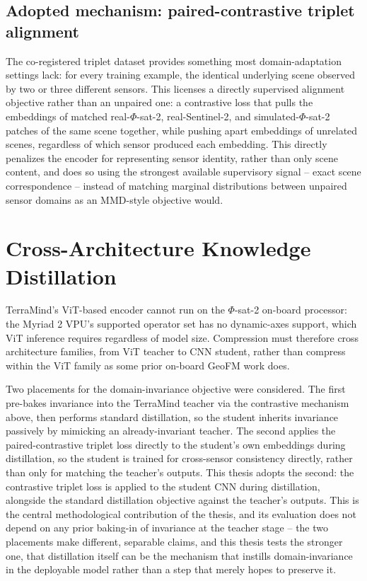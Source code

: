 \subsection{Adopted mechanism: paired-contrastive triplet alignment}
\label{sec:contrastive-mechanism}

The co-registered triplet dataset provides something most domain-adaptation settings lack: for every training example, the identical underlying scene observed by two or three different sensors.
This licenses a directly supervised alignment objective rather than an unpaired one: a contrastive loss that pulls the embeddings of matched real-$\Phi$-sat-2, real-Sentinel-2, and simulated-$\Phi$-sat-2 patches of the same scene together, while pushing apart embeddings of unrelated scenes, regardless of which sensor produced each embedding.
This directly penalizes the encoder for representing sensor identity, rather than only scene content, and does so using the strongest available supervisory signal -- exact scene correspondence -- instead of matching marginal distributions between unpaired sensor domains as an MMD-style objective would.

\section{Cross-Architecture Knowledge Distillation}
\label{sec:kd}

TerraMind's ViT-based encoder cannot run on the $\Phi$-sat-2 on-board processor: the Myriad 2 VPU's supported operator set has no dynamic-axes support, which ViT inference requires regardless of model size.
Compression must therefore cross architecture families, from ViT teacher to CNN student, rather than compress within the ViT family as some prior on-board GeoFM work does.

Two placements for the domain-invariance objective were considered.
The first pre-bakes invariance into the TerraMind teacher via the contrastive mechanism above, then performs standard distillation, so the student inherits invariance passively by mimicking an already-invariant teacher.
The second applies the paired-contrastive triplet loss directly to the student's own embeddings during distillation, so the student is trained for cross-sensor consistency directly, rather than only for matching the teacher's outputs.
This thesis adopts the second: the contrastive triplet loss is applied to the student CNN during distillation, alongside the standard distillation objective against the teacher's outputs.
This is the central methodological contribution of the thesis, and its evaluation does not depend on any prior baking-in of invariance at the teacher stage -- the two placements make different, separable claims, and this thesis tests the stronger one, that distillation itself can be the mechanism that instills domain-invariance in the deployable model rather than a step that merely hopes to preserve it.

